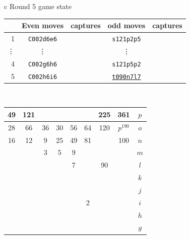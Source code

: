 \documentclass[12pt]{article}
\begin{document}
{\small{
\begin{tabular}{c}
Round 5 game state\\   
\begin{tabular}{r|cc|cc}
    & Even moves         & captures    & odd moves   &  captures \\    \hline 
1   &  {\tt C002d6e6} & \quad &  {\tt s121p2p5} & \quad \\
 \vdots  &  \vdots    & \quad &  \vdots        & \quad \\
4   &  {\tt C002g6h6} & \quad &  {\tt s121p5p2} & \quad \\
5   &  {\tt C002h6i6} & \quad &  \underline{\tt t090n7l7} & \quad \\
\end{tabular}
\\
\begin{tabular}{|c|c|c|c|c|c|c|c||c} \hline
\squadfill{\,}49 & \squadfill{\,}121 & \quad & \quad & \quad & \quad & \squadfill{\,}225 & \squadfill{\,}361 & $p$ \\ \hline
\squadfill{\,}28 & \squadfill{\,}66 & \trianglepafill{\,}36 & \trianglepafill{\,}30 &
\trianglepafill{\,}56 & \trianglepafill{\,}64 & \squadfill{\,}120 & \rhombusfill{\,}$p^{190}$ & $o$ \\ \hline
\trianglepafill{\,}16 & \trianglepafill{\,}12 & \circletfill{\,}9 & \circletfill{\,}25 & \circletfill{\,}49 & \circletfill{\,}81 & \quad & \trianglepafill{\,}100 & $n$ \\ \hline
\quad & \quad & \circletfill{\,}3 & \circletfill{\,}5 & \circletfill{\,}9 & \quad & \quad & \quad & $m$ \\ \hline
\quad & \quad & \quad & \quad & \circletfill{\,}7 & \quad & \trianglepafill{\,}90 & \quad & $l$ \\ \hline
\quad & \quad & \quad & \quad & \quad & \quad & \quad & \quad & $k$ \\ \hline
\quad & \quad & \quad & \quad & \quad & \quad & \quad & \quad & $j$ \\ \hline
\quad & \quad & \quad & \quad & \quad & \circlet{\,}2 & \quad & \quad & $i$ \\ \hline
\quad & \quad & \quad & \quad & \quad & \quad & \quad & \quad & $h$ \\ \hline
\quad & \quad & \quad & \quad & \quad & \quad & \quad & \quad & $g$ \\ \hline

\end{tabular}
\end{tabular}}}
\end{document}
